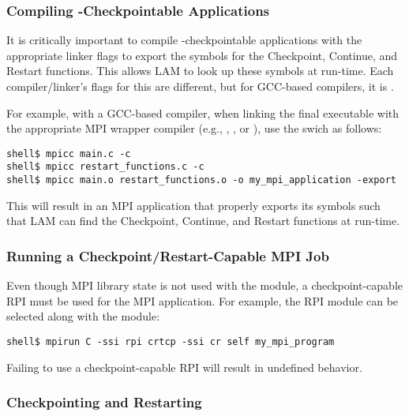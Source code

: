 
\subsubsection{Compiling -Checkpointable Applications}

It is critically important to compile -checkpointable
applications with the appropriate linker flags to export the symbols
for the Checkpoint, Continue, and Restart functions.  This allows LAM
to look up these symbols at run-time.  Each compiler/linker's flags
for this are different, but for GCC-based compilers, it is
.

For example, with a GCC-based compiler, when linking the final
executable with the appropriate MPI wrapper compiler (e.g., ,
, or ), use the  swich as follows:

\lstset{style=lam-cmdline}
\begin{lstlisting}
shell$ mpicc main.c -c
shell$ mpicc restart_functions.c -c
shell$ mpicc main.o restart_functions.o -o my_mpi_application -export
\end{lstlisting}

This will result in an MPI application that properly exports its
symbols such that LAM can find the Checkpoint, Continue, and Restart
functions at run-time.


\subsubsection{Running a Checkpoint/Restart-Capable MPI Job}

Even though MPI library state is not used with the 
module, a checkpoint-capable RPI must be used for the MPI application.
For example, the  RPI module can be selected along with the
 module:

\lstset{style=lam-cmdline}
\begin{lstlisting}
shell$ mpirun C -ssi rpi crtcp -ssi cr self my_mpi_program
\end{lstlisting}

Failing to use a checkpoint-capable RPI will result in undefined
behavior.

 
\subsubsection{Checkpointing and Restarting}

